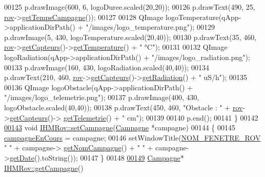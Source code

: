 \begin{DoxyCode}
00125     p.drawImage(600, 6, logoDuree.scaled(20,20));
00126     p.drawText(490, 25, \hyperlink{class_i_h_m_rov_a777ca33fdb295ba6b6773e880356fa1e}{rov}->\hyperlink{class_rov_aa977585d4377a57281004fd57208635a}{getTempsCampagne}());
00127 
00128     QImage logoTemperature(qApp->applicationDirPath() + \textcolor{stringliteral}{"/images/logo\_temperature.png"});
00129     p.drawImage(5, 430, logoTemperature.scaled(20,40));
00130     p.drawText(35, 460, \hyperlink{class_i_h_m_rov_a777ca33fdb295ba6b6773e880356fa1e}{rov}->\hyperlink{class_rov_a7e231245b39e7cc8026324e337b34c64}{getCapteurs}()->\hyperlink{class_capteurs_aa1346e5cbea9e37afc3694a0ea86bd99}{getTemperature}() + \textcolor{stringliteral}{" °C"});
00131 
00132     QImage logoRadiation(qApp->applicationDirPath() + \textcolor{stringliteral}{"/images/logo\_radiation.png"});
00133     p.drawImage(160, 430, logoRadiation.scaled(40,40));
00134     p.drawText(210, 460, \hyperlink{class_i_h_m_rov_a777ca33fdb295ba6b6773e880356fa1e}{rov}->\hyperlink{class_rov_a7e231245b39e7cc8026324e337b34c64}{getCapteurs}()->\hyperlink{class_capteurs_aaee3d64c752b09f8674fa62907f38cbc}{getRadiation}() + \textcolor{stringliteral}{" uS/h"});
00135 
00136     QImage logoObstacle(qApp->applicationDirPath() + \textcolor{stringliteral}{"/images/logo\_telemetrie.png"});
00137     p.drawImage(400, 430, logoObstacle.scaled(40,40));
00138     p.drawText(450, 460, \textcolor{stringliteral}{"Obstacle : "} + \hyperlink{class_i_h_m_rov_a777ca33fdb295ba6b6773e880356fa1e}{rov}->\hyperlink{class_rov_a7e231245b39e7cc8026324e337b34c64}{getCapteurs}()->
      \hyperlink{class_capteurs_ad8c2c486e92cc537dc014035b5634b60}{getTelemetrie}() + \textcolor{stringliteral}{" cm"});
00139 
00140     p.end();
00141 \}
00142 
\hyperlink{class_i_h_m_rov_a301a0b8cb323c2c9de71df9070bb7555}{00143} \textcolor{keywordtype}{void} \hyperlink{class_i_h_m_rov_a301a0b8cb323c2c9de71df9070bb7555}{IHMRov::setCampagne}(\hyperlink{class_campagne}{Campagne} *campagne)
00144 \{
00145     \hyperlink{class_i_h_m_rov_af0475e935531b7331f097ae13d07989b}{campagneEnCours} = campagne;
00146     setWindowTitle(\hyperlink{ihmrov_8h_aa7e4fcf0d5f67b5c84de425d1f4776ea}{NOM\_FENETRE\_ROV}  \textcolor{stringliteral}{" "} + campagne->
      \hyperlink{class_campagne_a99a682fcb8e5a3f8c2aff7a44eb2c930}{getNomCampagne}() + \textcolor{stringliteral}{" "} + campagne->\hyperlink{class_campagne_a319b5bb4ed2b0fc1a10fc4d099a7a6d2}{getDate}().toString());
00147 \}
00148 
\hyperlink{class_i_h_m_rov_ab3e8686eef9233b4c1e6711cf1c4576a}{00149} \hyperlink{class_campagne}{Campagne}* \hyperlink{class_i_h_m_rov_ab3e8686eef9233b4c1e6711cf1c4576a}{IHMRov::getCampagne}()

\end{DoxyCode}
